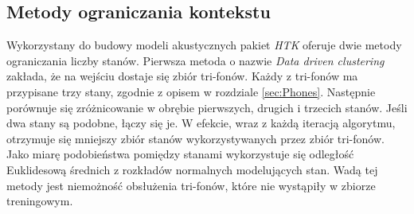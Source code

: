 \documentclass[shortabstract, mgr]{iithesis}
\begin{document}
	\subsection{Metody ograniczania kontekstu}
	\label{sec:state_red}
	Wykorzystany do budowy modeli akustycznych pakiet \textit{HTK} oferuje dwie metody ograniczania liczby stanów. Pierwsza metoda o nazwie \textit{Data driven clustering} zakłada, że na wejściu dostaje się zbiór tri-fonów. Każdy z tri-fonów ma przypisane trzy stany, zgodnie z opisem w rozdziale \ref{sec:Phones}. Następnie porównuje się zróżnicowanie w obrębie pierwszych, drugich i trzecich stanów. Jeśli dwa stany są podobne, łączy się je. W efekcie, wraz z każdą iteracją algorytmu, otrzymuje się mniejszy zbiór stanów wykorzystywanych przez zbiór tri-fonów. Jako miarę podobieństwa pomiędzy stanami wykorzystuje się odległość Euklidesową średnich z rozkładów normalnych modelujących stan. Wadą tej metody jest niemożność obsłużenia tri-fonów, które nie wystąpiły w zbiorze treningowym.
	
\end{document}
